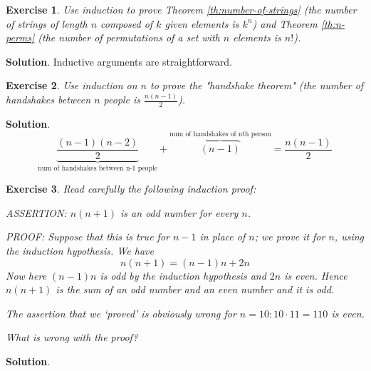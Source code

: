 \documentclass[11pt]{book}
\theoremstyle{definition}
\theoremstyle{plain}
\newtheorem{exercise}{Exercise}
\theoremstyle{definition}
\theoremstyle{problemstyle}
\theoremstyle{remark}
\theoremstyle{definition}
\begin{document}
\begin{exercise}
    \label{ex:2.1.10}
    Use induction to prove Theorem \ref{th:number-of-strings} (the number of strings of length $n$ composed of $k$ given elements is $k^n$) and Theorem \ref{th:n-perms} (the number of permutations of a set with $n$ elements is $n!$).
\end{exercise}
\textbf{Solution}. Inductive arguments are straightforward.
\begin{exercise}
    \label{ex:2.1.11}
    Use induction on $n$ to prove the "handshake theorem" (the number of handshakes between $n$ people is $\frac{n(n-1)}{2}$).
\end{exercise}
\textbf{Solution}. 
\[
    \underbrace{\frac{(n-1)(n-2)}{2}}_{\text{num of handshakes between n-1 people}}+\overbrace{(n-1)}^{\text{num of handshakes of nth person}}=\frac{n(n-1)}{2}
\]
\begin{exercise}
    \label{ex:2.1.12}
    Read carefully the following induction proof:

    ASSERTION: $n(n+1)$ is an odd number for every $n$.

    PROOF: Suppose that this is true for $n-1$ in place of $n$; we prove it for $n$, using the induction hypothesis. We have
\[
    n(n+1)=(n-1)n+2n
\]
Now here $(n-1)n$ is odd by the induction hypothesis and $2n$ is even.  Hence $n(n+1)$ is the sum of an odd number and an even number and it is odd.

The assertion that we `proved' is obviously wrong for $n=10:10\cdot11=110$ is even. 

What is wrong with the proof?
\end{exercise}
\textbf{Solution}.
\end{document}
